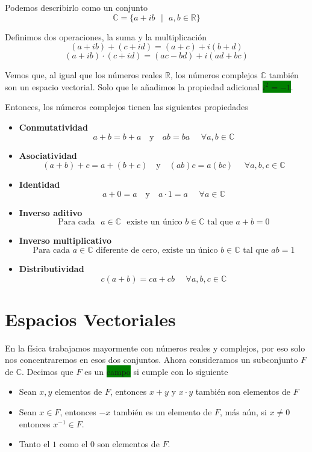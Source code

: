 \documentclass[11pt]{article}
\begin{document}
Podemos describirlo como un conjunto
\[
\mathbb{C}=\{a+ib \text{ }  | \text{ } a,b\in \mathbb{R}\}
\]

Definimos dos operaciones, la suma y la multiplicación
\[
(a+ib)+(c+id)=(a+c)+i(b+d)
\]
\[
(a+ib)\cdot(c+id)=(ac-bd)+i(ad+bc)
\]


Vemos que, al igual que los números reales $\mathbb{R}$, los números complejos $\mathbb{C}$ también son un espacio vectorial. Solo que le añadimos la propiedad adicional \colorbox{Green}{$i^2=-1$}.

Entonces, los números complejos tienen las siguientes propiedades

\begin{itemize}
    \item \textbf{Conmutatividad}
    \[
    a+b=b+a \text{ }\text{ y }\text{ } ab=ba \text{ }\text{ } \forall a,b\in \mathbb{C}
    \]
    \item \textbf{Asociatividad}
    \[
    (a+b)+c=a+(b+c) \text{ }\text{ y } \text{ } (ab)c=a(bc) \text{ }\text{ } \forall a,b,c\in\mathbb{C}
    \]
    \item \textbf{Identidad}
    \[
    a+0=a \text{ } \text{ y } \text{ } a\cdot 1=a \text{ }\text{ } \forall a\in \mathbb{C}
    \]
    \item \textbf{Inverso aditivo}
    \[
    \text{Para cada} \text{ } a\in\mathbb{C} \text{ } \text{existe un único } b \in \mathbb{C} \text{ tal que } a+b=0
    \]
    \item \textbf{Inverso multiplicativo}
    \[
    \text{Para cada } a \in \mathbb{C} \text{ diferente de cero, existe un único } b\in \mathbb{C} \text{ tal que } ab=1
    \]
    \item \textbf{Distributividad}
    \[
    c(a+b)=ca +cb \text{ } \text{ } \forall a,b,c\in \mathbb{C}
    \]
\end{itemize}

\section{Espacios Vectoriales}

En la física trabajamos mayormente con números reales y complejos, por eso solo nos concentraremos en esos dos conjuntos. Ahora consideramos un subconjunto $F$ de $\mathbb{C}$. Decimos que $F$ es un \colorbox{Green}{campo} si cumple con lo siguiente

\begin{itemize}
    \item Sean $x,y$ elementos de $F$, entonces $x+y$ y $x\cdot y$ también son elementos de $F$
    \item Sean $x\in F$, entonces $-x$ también es un elemento de $F$, más aún, si $x\neq 0$ entonces $x^{-1}\in F$.
    \item Tanto el $1$ como el $0$ son elementos de $F$.
\end{itemize}
\end{document}
